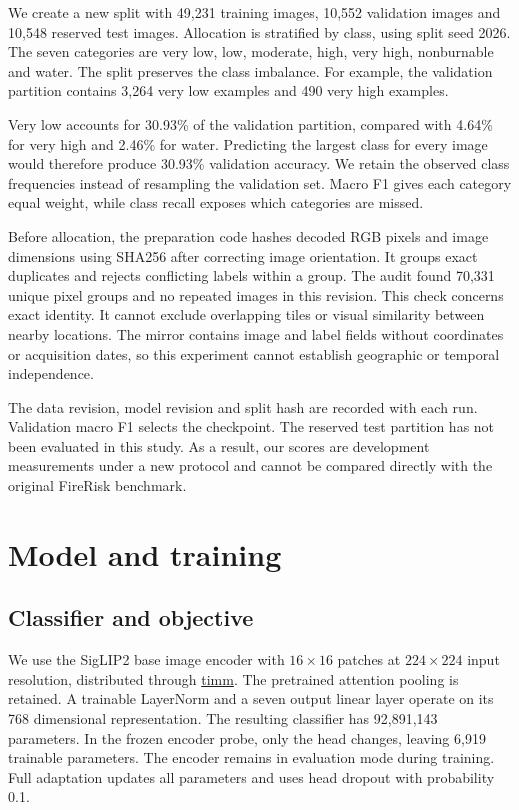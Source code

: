 \documentclass[10pt,a4paper]{article}
\begin{document}
We create a new split with 49,231 training images, 10,552 validation images
and 10,548 reserved test images. Allocation is stratified by class, using
split seed 2026. The seven categories are very low, low, moderate, high, very
high, nonburnable and water. The split preserves the class imbalance. For
example, the validation partition contains 3,264 very low examples and 490
very high examples.

Very low accounts for 30.93\% of the validation partition, compared with
4.64\% for very high and 2.46\% for water. Predicting the largest class for
every image would therefore produce 30.93\% validation accuracy. We retain
the observed class frequencies instead of resampling the validation set.
Macro F1 gives each category equal weight, while class recall exposes which
categories are missed.

Before allocation, the preparation code hashes decoded RGB pixels and image
dimensions using SHA256 after correcting image orientation. It groups exact
duplicates and rejects conflicting labels within a group. The audit found
70,331 unique pixel groups and no repeated images in this revision. This
check concerns exact identity. It cannot exclude overlapping tiles or visual
similarity between nearby locations. The mirror contains image and label
fields without coordinates or acquisition dates, so this experiment cannot
establish geographic or temporal independence.

The data revision, model revision and split hash are recorded with each run.
Validation macro F1 selects the checkpoint. The reserved test partition has
not been evaluated in this study. As a result, our scores are development
measurements under a new protocol and cannot be compared directly with the
original FireRisk benchmark.

\section{Model and training}

\subsection{Classifier and objective}

We use the SigLIP2 base image encoder with $16\times16$ patches at
$224\times224$ input resolution, distributed through
\href{https://huggingface.co/timm/vit_base_patch16_siglip_224.v2_webli}{timm}.
The pretrained attention pooling is retained. A trainable LayerNorm and a
seven output linear layer operate on its 768 dimensional representation.
The resulting classifier has 92,891,143 parameters. In the frozen encoder
probe, only the head changes, leaving 6,919 trainable parameters. The encoder
remains in evaluation mode during training. Full adaptation updates all
parameters and uses head dropout with probability 0.1.
\end{document}
